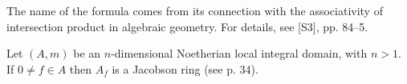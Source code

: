 \begin{remark}
The name of the formula comes from its connection with the associativity
of intersection product in algebraic geometry. For details, see [S3], pp. 84--5.
\end{remark}

\begin{exercise}\label{ex:14.7-ex}
Let $(A, m)$ be an $n$-dimensional Noetherian local integral domain, with
$n > 1$. If $0 \neq f \in A$ then $A_f$ is a Jacobson ring (see p. 34).
\end{exercise}
